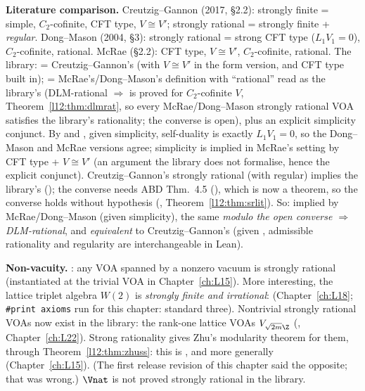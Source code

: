 \begin{dictionary}
\textbf{Literature comparison.} Creutzig--Gannon (2017, §2.2): strongly finite = simple, $C_2$-cofinite, CFT type,
$V\cong V'$; strongly rational = strongly finite + \emph{regular}. Dong--Mason (2004, §3): strongly rational = strong CFT
type ($L_1V_1 = 0$), $C_2$-cofinite, rational. McRae (§2.2): CFT type, $V\cong V'$, $C_2$-cofinite, rational. The library:
 = Creutzig--Gannon's (with $V\cong V'$ in the form version, and CFT type built in);
 = McRae's/Dong--Mason's definition with ``rational'' read as the library's
 (DLM-rational $\Rightarrow$  is proved for $C_2$-cofinite $V$,
Theorem~\ref{l12:thm:dlmrat}, so every McRae/Dong--Mason strongly rational VOA satisfies the library's rationality; the
converse is open), plus an
explicit simplicity conjunct. By
 and , given simplicity, self-duality is exactly $L_1V_1 = 0$, so the
Dong--Mason and McRae versions agree; simplicity is implied in McRae's setting by CFT type + $V\cong V'$ (an argument the
library does not formalise, hence the explicit conjunct). Creutzig--Gannon's strongly rational (with regular) implies the
library's (\allowbreak{}\allowbreak{}); the converse needs ABD Thm.~4.5 (\allowbreak{}\allowbreak{}\allowbreak{}),
which is now a theorem, so the converse holds without hypothesis (, Theorem~\ref{l12:thm:srlit}).
So: implied by McRae/Dong--Mason (given simplicity), the same \emph{modulo the open converse
 $\Rightarrow$ DLM-rational}, and
\emph{equivalent} to Creutzig--Gannon's (given
, admissible rationality and regularity are interchangeable in Lean).

\textbf{Non-vacuity.} \allowbreak{}\allowbreak{}\allowbreak{}: any VOA spanned by a nonzero vacuum is strongly rational
(instantiated at the trivial VOA in Chapter~\ref{ch:L15}). More interesting, the lattice triplet algebra $W(2)$ is
\emph{strongly finite and irrational}:
\allowbreak{}\allowbreak{}\allowbreak{}\allowbreak{}\allowbreak{}\allowbreak{}\allowbreak{} (Chapter~\ref{ch:L18}; \texttt{\#print axioms} run for
this chapter: standard three). Nontrivial strongly rational VOAs now exist in the library: the rank-one lattice VOAs
$V_{\sqrt{2m}\Z}$ (, Chapter~\ref{ch:L22}). Strong rationality gives Zhu's modularity theorem for
them, through Theorem~\ref{l12:thm:zhuss}: this is , and more generally
\allowbreak{}\allowbreak{} (Chapter~\ref{ch:L15}). (The first release
revision of this chapter said the opposite; that was wrong.) $\Vnat$ is not proved strongly rational in the library.
\end{dictionary}

